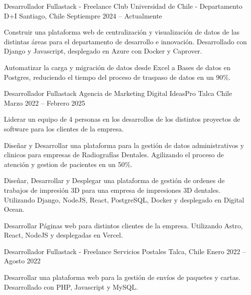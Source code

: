 \documentclass[]{awesome-cv}
\begin{document}
\begin{cventries}
	\cventry
	{Desarrollador Fullastack - Freelance}
	{Club Universidad de Chile - Departamento D+I}
	{Santiago, Chile}
	{Septiempre 2024 – Actualmente}
	{\begin{cvitems}
		\vspace{0.5mm}
		\item {Construir una plataforma web de centralización y visualización de datos de las distintas áreas para el departamento de desarrollo e innovación. Desarrollado con Django y Javascript, desplegado en Azure con Docker y Caprover.}
		\item {Automatizar la carga y migración de datos desde Excel a Bases de datos en Postgres, reduciendo el tiempo del proceso de traspaso de datos en un 90\%.}
		\end{cvitems}}

	\cventry
	{Desarrollador Fullastack}
	{Agencia de Marketing Digital IdeasPro}
	{Talca Chile}
	{Marzo 2022 – Febrero 2025}
	{\begin{cvitems}
		\vspace{0.5mm}
		\item {Liderar un equipo de 4 personas en los desarrollos de los distintos proyectos de software para los clientes de la empresa.}
		\item {Diseñar y Desarrollar una plataforma para la gestión de datos administrativos y clinicos para empresas de Radiografías Dentales. Agilizando el proceso de atención y gestion de pacientes en un 50\%.}
		\item {Diseñar, Desarrollar y Desplegar una plataforma de gestión de ordenes de trabajos de impresión 3D para una empresa de impresiones 3D dentales. Utilizando Django, NodeJS, React, PostgreSQL, Docker y desplegado en Digital Ocean.}
		\item {Desarrollar Páginas web para distintos clientes de la empresa. Utilizando Astro, React, NodeJS y desplegadas en Vercel.}
		\end{cvitems}}

	\cventry
	{Desarrollador Fullastack - Freelance}
	{Servicios Postales}
	{Talca, Chile}
	{Enero 2022 – Agosto 2022}
	{\begin{cvitems}
		\vspace{0.5mm}
		\item {Desarrollar una plataforma web para la gestión de envíos de paquetes y cartas. Desarrollado con PHP, Javascript y MySQL.}
		\end{cvitems}}
\end{cventries}
\end{document}
